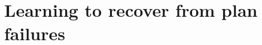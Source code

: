 \documentclass[Dual]{iitddiss}
\begin{document}
\chapter{Learning to recover from plan failures}
\pagebreak

\pagebreak

\pagebreak

\pagebreak

\pagebreak

\pagebreak

\pagebreak

\pagebreak

% 

% 

% 

% 
% 

% 
% 



% 
\end{document}
